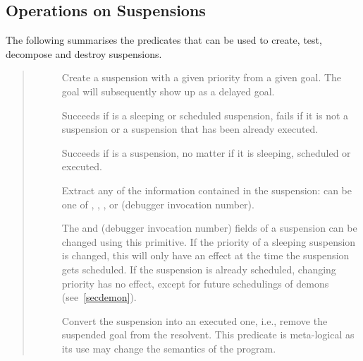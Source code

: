 \subsection{Operations on Suspensions}
The following summarises the predicates that can be used to create, test,
decompose and destroy suspensions.
\begin{quote}
\begin{description}
\item[]
Create a suspension with a given priority from a given goal.
The goal will subsequently show up as a delayed goal.

\item[]
Succeeds if  is a sleeping or scheduled suspension,
fails if it is not a suspension or a suspension that has been already executed.

\item[]
Succeeds if  is a suspension, no matter if it is
sleeping, scheduled or executed.

\item[]
Extract any of the information contained in the suspension:
 can be one of
, , ,  or
 (debugger invocation number).


\item[]
The  and  (debugger invocation number) fields
of a suspension can be changed using this primitive.
If the priority of a sleeping suspension is changed,
this will only have an effect at the time the suspension gets
scheduled. If the suspension is already scheduled, changing
priority has no effect, except for future schedulings of demons
(see~\ref{secdemon}).


\item[]
Convert the suspension  into an executed
one, i.e., remove the suspended goal from the resolvent.
This predicate is meta-logical as its use may
change the semantics of the program.
\end{description}
\end{quote}



